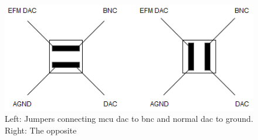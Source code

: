 \begin{figure}[h!]
\centering
\includegraphics[scale = 0.6]{images/DAC_headers.png}
\caption{Left: Jumpers connecting \gls{mcu} \gls{dac} to \gls{bnc} and normal \gls{dac} to ground. Right: The opposite}
\label{fig:DAC headers}
\end{figure}
